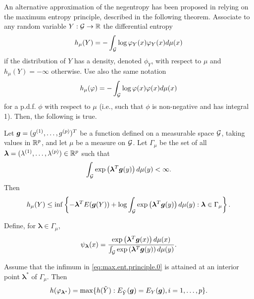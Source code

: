 An alternative approximation of the negentropy has been proposed in \citet{hyvarinen1998new} relying on the maximum entropy principle, described in the following theorem. Associate to any random variable $Y:{\mathcal G} \to {\mathbb{R}}$ the differential entropy
\[
h_\mu(Y) = - \int_{{\mathcal G}} \log \varphi_Y(x) \varphi_Y(x) d\mu(x)
\]
if the distribution of $Y$ has a density, denoted $\phi_Y$, with respect to $\mu$ and $h_\mu(Y) = -\infty$ otherwise.
Use also the same notation
\[
h_\mu(\varphi) = - \int_{{\mathcal G}} \log \varphi(x) \varphi(x) d\mu(x)
\]
for a p.d.f. $\phi$ with respect to $\mu$ (i.e., such that $\phi$ is non-negative and has integral 1). Then, the following is true.
\begin{theorem}
\label{th:max.ent.principle}
Let ${\bm{g}} = (g^{(1)}, \ldots, g^{(p)})^T$ be a function defined on a measurable space ${\mathcal G}$, taking values in ${\mathbb{R}}^p$, and let $\mu$ be a measure on ${\mathcal G}$. Let $\Gamma_\mu$ be the set of all   
$\bm\lambda = (\lambda^{(1)}, \ldots, \lambda^{(p)})\in {\mathbb{R}}^p$ such that 
\begin{equation}
\label{eq:max.ent.principle.2}
\int_{\mathcal G} \exp\left(\bm{\lambda}^T {\bm{g}}(y)\right) d\mu(y) < \infty.
\end{equation}
Then 
\begin{equation}
\label{eq:max.ent.principle.0}
h_\mu(Y) \leq \mathrm{inf}\left\{- \bm{\lambda}^T E({\bm{g}}(Y)) + \log \int_{\mathcal G} \exp\left(\bm{\lambda}^T {\bm{g}}(y)\right) d\mu(y): \bm\lambda \in \Gamma_\mu \right\}.
\end{equation}


Define, for $\boldsymbol\lambda\in \Gamma_\mu$, 
\begin{equation}
\label{eq:max.ent.exp}
\psi_{\bm \lambda}(x) = \frac{\exp\left(\bm{\lambda}^T {\bm{g}}(x)\right) d\mu(x)}{\int_{\mathcal G} \exp\left(\bm{\lambda}^T {\bm{g}}(y)\right) d\mu(y)}.
\end{equation}

Assume that the infimum in \cref{eq:max.ent.principle.0} is attained at an interior point $\boldsymbol \lambda^*$ of $\Gamma_\mu$. Then 
\begin{equation}
\label{eq:max.ent.principle.3}
h(\varphi_{\bm\lambda^*}) = \max\{h(\tilde Y): E_{\tilde Y}({\bm{g}}) = E_Y({\bm{g}}), i=1, \ldots, p\}.
\end{equation}
\end{theorem}

